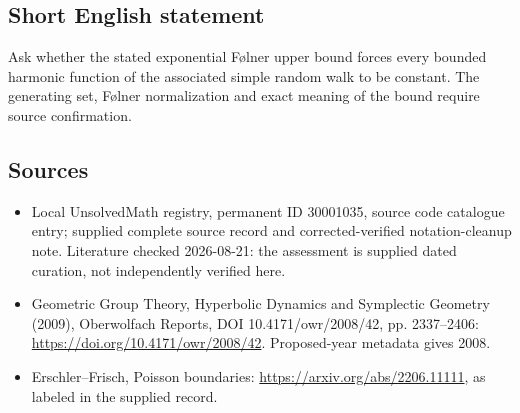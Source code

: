 \documentclass[11pt]{article}
\begin{document}
\subsection{Short English statement}
Ask whether the stated exponential Følner upper bound forces every bounded harmonic function of the associated simple random walk to be constant. The generating set, Følner normalization and exact meaning of the bound require source confirmation.
\subsection{Sources}
\begin{itemize}
\item Local UnsolvedMath registry, permanent ID 30001035, source code catalogue entry; supplied complete source record and corrected-verified notation-cleanup note. Literature checked 2026-08-21: the assessment is supplied dated curation, not independently verified here.
\item Geometric Group Theory, Hyperbolic Dynamics and Symplectic Geometry (2009), Oberwolfach Reports, DOI 10.4171/owr/2008/42, pp. 2337--2406: \url{https://doi.org/10.4171/owr/2008/42}. Proposed-year metadata gives 2008.
\item Erschler--Frisch, Poisson boundaries: \url{https://arxiv.org/abs/2206.11111}, as labeled in the supplied record.
\end{itemize}
\end{document}

